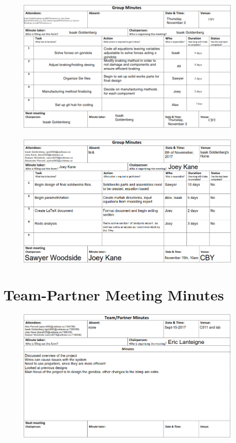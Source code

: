 \documentclass[../main.tex]{subfiles}
\begin{document}
		\begin{figure}[H]
			\centering
			\includegraphics[height=0.8\textheight]{img/minutes/2017-11-02.PNG}
		\end{figure}
		\begin{figure}[H]
			\centering
			\includegraphics[height=0.8\textheight]{img/minutes/2017-11-08.PNG}
		\end{figure}
	\section{Team-Partner Meeting Minutes}
		\begin{figure}[H]
			\centering
			\includegraphics[height=0.75\textwidth]{img/minutes/2017-09-15.PNG}
		\end{figure}
\end{document}
